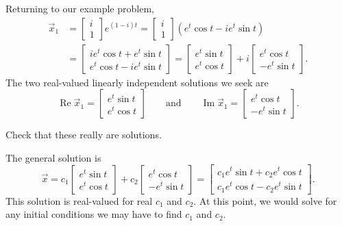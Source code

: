 Returning to our example problem,
\begin{equation*}
\begin{split}
\vec{x}_1 & =
\begin{bmatrix} i \\ 1 \end{bmatrix} e^{(1-i)t}
=
\begin{bmatrix} i \\ 1 \end{bmatrix} \left( e^t \cos t - i e^t \sin t \right)
\\
& =
\begin{bmatrix}
i e^t \cos t + e^t \sin t  \\
e^t \cos t - i e^t \sin t
\end{bmatrix}
=
\begin{bmatrix}
e^t \sin t  \\
e^t \cos t
\end{bmatrix}
+ i
\begin{bmatrix}
e^t \cos t  \\
- e^t \sin t
\end{bmatrix}
.
\end{split}
\end{equation*}
The two real-valued linearly independent solutions we seek are
\begin{equation*}
\operatorname{Re} \vec{x}_1 = 
\begin{bmatrix}
e^t \sin t  \\
e^t \cos t
\end{bmatrix}
\qquad \text{and} \qquad
\operatorname{Im} \vec{x}_1 = 
\begin{bmatrix}
e^t \cos t \\
- e^t \sin t
\end{bmatrix}
.
\end{equation*}

\begin{exercise}
Check that these really are solutions.
\end{exercise}

The general solution is
\begin{equation*}
\vec{x}
=
c_1
\begin{bmatrix}
e^t \sin t  \\
e^t \cos t
\end{bmatrix} 
+ c_2
\begin{bmatrix}
e^t \cos t \\
-e^t \sin t
\end{bmatrix} 
=
\begin{bmatrix}
c_1 e^t \sin t + c_2 e^t \cos t \\
c_1 e^t \cos t - c_2 e^t \sin t
\end{bmatrix} .
\end{equation*}
This solution is real-valued for real $c_1$ and $c_2$.  At this point, we would solve
for any initial conditions we may have to find $c_1$ and $c_2$.

